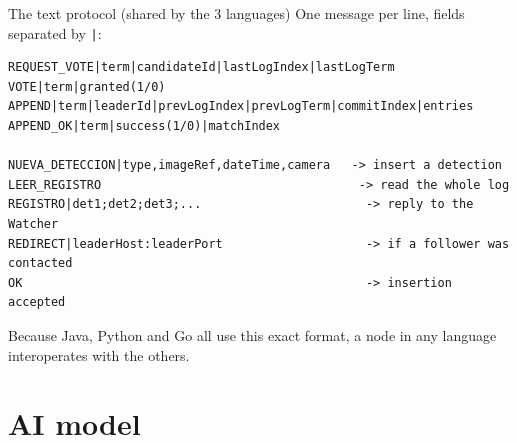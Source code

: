 \documentclass[aspectratio=169,11pt]{beamer}
\begin{document}
\begin{frame}[fragile]{The text protocol (shared by the 3 languages)}
\footnotesize
One message per line, fields separated by \texttt{|}:
\begin{lstlisting}
REQUEST_VOTE|term|candidateId|lastLogIndex|lastLogTerm
VOTE|term|granted(1/0)
APPEND|term|leaderId|prevLogIndex|prevLogTerm|commitIndex|entries
APPEND_OK|term|success(1/0)|matchIndex

NUEVA_DETECCION|type,imageRef,dateTime,camera   -> insert a detection
LEER_REGISTRO                                    -> read the whole log
REGISTRO|det1;det2;det3;...                       -> reply to the Watcher
REDIRECT|leaderHost:leaderPort                    -> if a follower was contacted
OK                                                -> insertion accepted
\end{lstlisting}
Because Java, Python and Go all use this exact format, a node in any language
interoperates with the others.
\end{frame}

\section{AI model}
\end{document}
